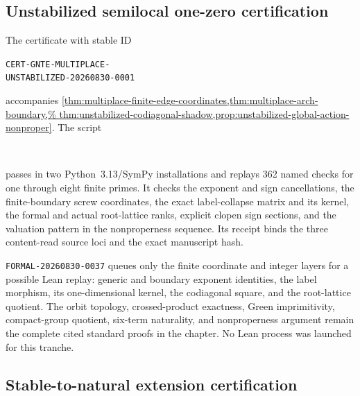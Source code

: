 \subsection{Unstabilized semilocal one-zero certification}

The certificate with stable ID
\begin{center}\small
\texttt{CERT-GNTE-MULTIPLACE-}\\
\texttt{UNSTABILIZED-20260830-0001}
\end{center}
accompanies \cref{thm:multiplace-finite-edge-coordinates,thm:multiplace-arch-boundary,%
thm:unstabilized-codiagonal-shadow,prop:unstabilized-global-action-nonproper}.
The script
\begin{center}\small
{}\\
\end{center}
passes in two Python~3.13/SymPy installations and replays 362 named checks for
one through eight finite primes.  It checks the exponent and sign cancellations,
the finite-boundary screw coordinates, the exact label-collapse matrix and its
kernel, the formal and actual root-lattice ranks, explicit clopen sign sections,
and the valuation pattern in the nonproperness sequence.  Its receipt binds the
three content-read source loci and the exact manuscript hash.

\texttt{FORMAL-20260830-0037} queues only the finite coordinate and integer
layers for a possible Lean replay: generic and boundary exponent identities,
the label morphism, its one-dimensional kernel, the codiagonal square, and the
root-lattice quotient.  The orbit topology, crossed-product exactness, Green
imprimitivity, compact-group quotient, six-term naturality, and nonproperness
argument remain the complete cited standard proofs in the chapter.  No Lean
process was launched for this tranche.

\subsection{Stable-to-natural extension certification}


